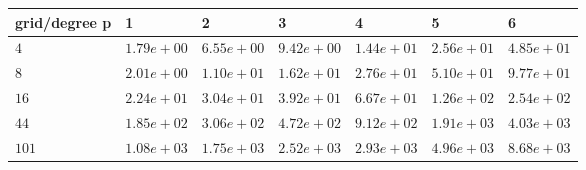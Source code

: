 \begin{tabular}{lllllll}
\hline
 grid/degree p   & 1          & 2          & 3          & 4          & 5          & 6          \\
\hline
 $4$             & $1.79e+00$ & $6.55e+00$ & $9.42e+00$ & $1.44e+01$ & $2.56e+01$ & $4.85e+01$ \\
 $8$             & $2.01e+00$ & $1.10e+01$ & $1.62e+01$ & $2.76e+01$ & $5.10e+01$ & $9.77e+01$ \\
 $16$            & $2.24e+01$ & $3.04e+01$ & $3.92e+01$ & $6.67e+01$ & $1.26e+02$ & $2.54e+02$ \\
 $44$            & $1.85e+02$ & $3.06e+02$ & $4.72e+02$ & $9.12e+02$ & $1.91e+03$ & $4.03e+03$ \\
 $101$           & $1.08e+03$ & $1.75e+03$ & $2.52e+03$ & $2.93e+03$ & $4.96e+03$ & $8.68e+03$ \\
\hline
\end{tabular}